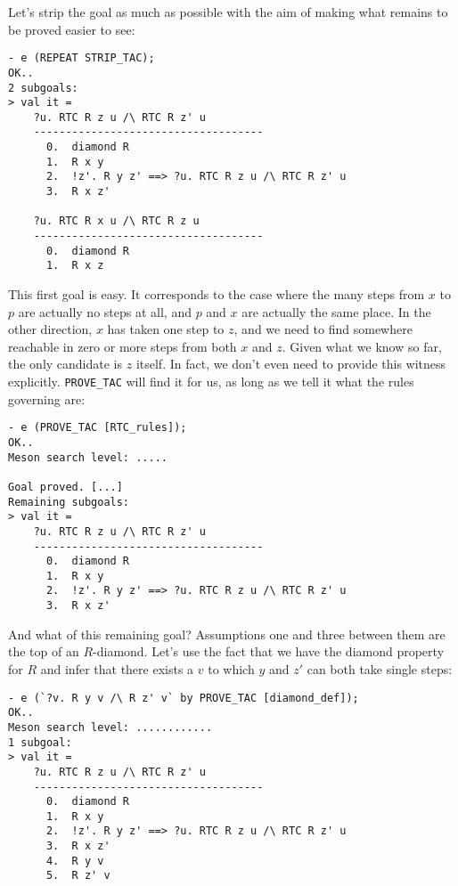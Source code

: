 Let's strip the goal as much as possible with the aim of making what
remains to be proved easier to see:
\begin{session}
\begin{verbatim}
- e (REPEAT STRIP_TAC);
OK..
2 subgoals:
> val it =
    ?u. RTC R z u /\ RTC R z' u
    ------------------------------------
      0.  diamond R
      1.  R x y
      2.  !z'. R y z' ==> ?u. RTC R z u /\ RTC R z' u
      3.  R x z'

    ?u. RTC R x u /\ RTC R z u
    ------------------------------------
      0.  diamond R
      1.  R x z
\end{verbatim}
\end{session}
This first goal is easy.  It corresponds to the case where the many
steps from $x$ to $p$ are actually no steps at all, and $p$ and $x$
are actually the same place.  In the other direction, $x$ has taken
one step to $z$, and we need to find somewhere reachable in zero or
more steps from both $x$ and $z$.  Given what we know so far, the only
candidate is $z$ itself.  In fact, we don't even need to provide this
witness explicitly. \texttt{PROVE\_TAC} will find it for us, as long
as we tell it what the rules governing  are:
\begin{session}
\begin{verbatim}
- e (PROVE_TAC [RTC_rules]);
OK..
Meson search level: .....

Goal proved. [...]
Remaining subgoals:
> val it =
    ?u. RTC R z u /\ RTC R z' u
    ------------------------------------
      0.  diamond R
      1.  R x y
      2.  !z'. R y z' ==> ?u. RTC R z u /\ RTC R z' u
      3.  R x z'
\end{verbatim}
\end{session}
    And what of this remaining goal?  Assumptions one and three
    between them are the top of an $R$-diamond.  Let's use the fact
    that we have the diamond property for $R$ and infer that there
    exists a $v$ to which $y$ and $z'$ can both take single steps:
\begin{session}
\begin{verbatim}
- e (`?v. R y v /\ R z' v` by PROVE_TAC [diamond_def]);
OK..
Meson search level: ............
1 subgoal:
> val it =
    ?u. RTC R z u /\ RTC R z' u
    ------------------------------------
      0.  diamond R
      1.  R x y
      2.  !z'. R y z' ==> ?u. RTC R z u /\ RTC R z' u
      3.  R x z'
      4.  R y v
      5.  R z' v
\end{verbatim}
\end{session}
